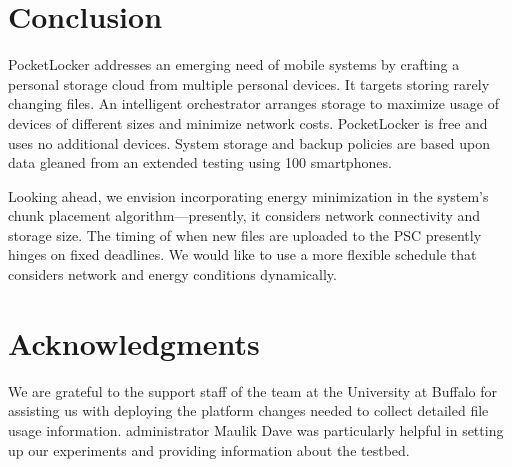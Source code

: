 
\section{Conclusion}
\label{sec-conclusion}

PocketLocker addresses an emerging need of mobile systems by crafting a
personal storage cloud from multiple personal devices.  It targets storing
rarely changing files. An intelligent orchestrator arranges storage to maximize
usage of devices of different sizes and minimize network costs.  PocketLocker
is free and uses no additional devices. System storage and backup policies are
based upon data gleaned from an extended testing using 100 smartphones.

Looking ahead, we envision incorporating energy minimization in the system's
chunk placement algorithm---presently, it considers network connectivity and
storage size.  The timing of when new files are uploaded to the PSC presently
hinges on fixed deadlines.  We would like to use a more flexible schedule that
considers network and energy conditions dynamically.

\section*{Acknowledgments}

We are grateful to the support staff of the \PhoneLab{} team at the University
at Buffalo for assisting us with deploying the platform changes needed to
collect detailed file usage information. \PhoneLab{} administrator Maulik Dave
was particularly helpful in setting up our experiments and providing
information about the testbed.


